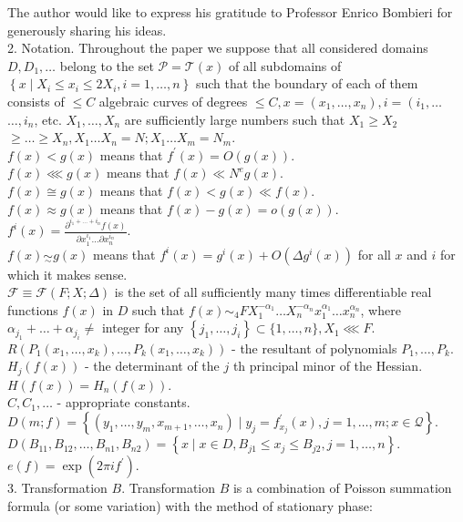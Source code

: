 \documentclass[10pt]{article}
\begin{document}
The author would like to express his gratitude to Professor Enrico Bombieri for generously sharing his ideas.\\
2. Notation. Throughout the paper we suppose that all considered domains $D, D_{1}, \ldots$ belong to the set $\mathscr{P}=\mathscr{T}(x)$ of all subdomains of $\left\{x \mid X_{i} \leqslant x_{i} \leqslant 2 X_{i}, i=1, \ldots, n\right\}$ such that the boundary of each of them\\
consists of $\leqslant C$ algebraic curves of degrees $\leqslant C, x=\left(x_{1}, \ldots, x_{n}\right), i=\left(i_{1}, \ldots\right.$ $\ldots, i_{n}$, etc. $X_{1}, \ldots, X_{n}$ are sufficiently large numbers such that $X_{1} \geqslant X_{2}$ $\geqslant \ldots \geqslant X_{n}, X_{1} \ldots X_{n}=N ; X_{1} \ldots X_{m}=N_{m}$.\\
$f(x)<g(x)$ means that $f^{\prime}(x)=O(g(x))$.\\
$f(x) \lll g(x)$ means that $f(x) \ll N^{e} g(x)$.\\
$f(x) \cong g(x)$ means that $f(x)<g(x) \ll f(x)$.\\
$f(x) \approx g(x)$ means that $f(x)-g(x)=o(g(x))$.\\
$f^{i}(x)=\frac{\partial^{i_{1}+\ldots+i_{n}} f(x)}{\partial x_{1}^{i_{1}} \ldots \partial x_{n}^{i_{n}}}$.\\
$f(x) \underset{\sim}{\sim} g(x)$ means that $f^{i}(x)=g^{i}(x)+O\left(\Delta g^{i}(x)\right)$ for all $x$ and $i$ for which it makes sense.\\
$\mathscr{F} \equiv \mathscr{F}(F ; X ; \Delta)$ is the set of all sufficiently many times differentiable real functions $f(x)$ in $D$ such that $f(x) \sim_{4} F X_{1}^{-\alpha_{1}} \ldots X_{n}^{-\alpha_{n}} x_{1}^{\alpha_{1}} \ldots x_{n}^{\alpha_{n}}$, where $\alpha_{j_{1}}+\ldots+\alpha_{j_{i}} \neq$ integer for any $\left\{j_{1}, \ldots, j_{i}\right\} \subset\{1, \ldots, n\}, X_{1} \lll F$.\\
$R\left(P_{1}\left(x_{1}, \ldots, x_{k}\right), \ldots, P_{k}\left(x_{1}, \ldots, x_{k}\right)\right)$ - the resultant of polynomials $P_{1}, \ldots, P_{k}$.\\
$H_{j}(f(x))$ - the determinant of the $j$ th principal minor of the Hessian. $H(f(x))=H_{n}(f(x))$.\\
$C, C_{1}, \ldots$ - appropriate constants.\\
$D(m ; f)=\left\{\left(y_{1}, \ldots, y_{m}, x_{m+1}, \ldots, x_{n}\right) \mid y_{j}=f_{x_{j}}^{\prime}(x), j=1, \ldots, m ; x \in \mathscr{Q}\right\}$.\\
$D\left(B_{11}, B_{12}, \ldots, B_{n 1}, B_{n 2}\right)=\left\{x \mid x \in D, B_{j 1} \leqslant x_{j} \leqslant B_{j 2}, j=1, \ldots, n\right\}$.\\
$e(f)=\exp \left(2 \pi i f^{\prime}\right)$.\\
3. Transformation $B$. Transformation $B$ is a combination of Poisson summation formula (or some variation) with the method of stationary phase:
\end{document}

